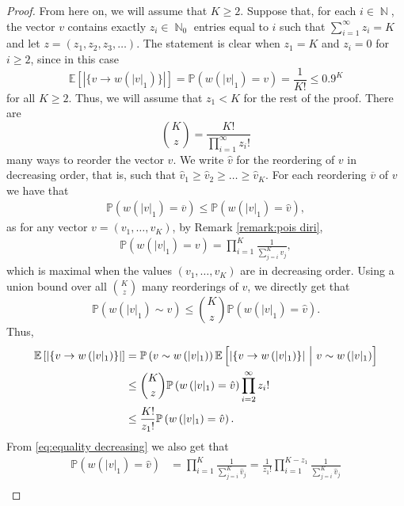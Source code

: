 \documentclass[11pt]{article}
\numberwithin{equation}{section}
\DeclareMathOperator{\N}{\mathbb{N}} %
\newcommand{\p}{\mathbb{P}} %
\newcommand{\E}{\mathbb{E}} %
\newcommand{\be}{\begin{equation}}
\newcommand{\ee}{\end{equation}}
\theoremstyle{definition}
\begin{document}
\begin{proof}
From here on, we will assume that $K \geq 2$.
Suppose that, for each $i\in \N$, the vector $v$ contains exactly $z_i\in\N_0$ entries equal to $i$ such that $\sum_{i=1}^\infty z_i = K$ and let $z = (z_1, z_2, z_3, \dots)$.
The statement is clear when $z_1=K$ and $z_i = 0$ for $i\geq 2$, since in this case
\begin{equation*}
    \E[|\{v\rightarrow w(|v|_1)\}|] = \p \left( w(|v|_1) = v  \right) = \frac{1}{K!} \leq 0.9^K
\end{equation*}
for all $K \geq 2$. Thus, we will assume that $z_1 < K$ for the rest of the proof.
There are 
\be 
\binom{K}{z} = \frac{K!}{\prod_{i=1}^{\infty} z_i!}
\ee 
many ways to reorder the vector $v$. We write $\hat{v}$ for the reordering of $v$ in decreasing order, that is, such that $\hat{v}_1\geq \hat{v}_2\geq \ldots  \geq \hat{v}_K.$ For each reordering $\overline{v}$ of $v$ we have that 
\begin{align*}
	\p\left(w\left(|v|_1\right) = \overline{v} \right)
	\leq
	\p\left(w\left(|v|_1\right) =\hat{v} \right),
\end{align*}
as for any vector $v=(v_1,\ldots,v_K)$, by Remark \ref{remark:pois diri},
\begin{align}\label{eq:equality decreasing}
    \p\left(w\left(|v|_1\right) = v \right) = \prod_{i=1}^{K} \frac{1}{\sum_{j=i}^{K} v_j},
\end{align}
which is maximal when the values $(v_1,\ldots, v_K)$ are in decreasing order. Using a union bound over all $\binom{K}{z}$ many reorderings of $v$, we directly get that 
\be 
\p\left(w\left(|v|_1\right) \sim v \right) \leq \binom{K}{z} \p\left(w\left(|v|_1\right) = \hat{v} \right).
\ee
Thus,
\begin{align}\label{eq:isomorphis expect}
	 \notag \E \left[| \{ v \rightarrow w \left(|v|_1\right) \}|\right]  &= \p \left( v \sim w \left(|v|_1\right) \right)
	 \E \left[| \{ v \rightarrow w \left(|v|_1\right) \}| \ \Big| \ v \sim w \left(|v|_1\right) \right]\\
	 & \notag
	 \leq
	\binom{K}{z}
	\p\left(w\left(|v|_1\right) =  \hat{v}  \right)
	\prod_{i=2}^{\infty} z_i!\\
	&
	\leq 
	\frac{K!}{z_1! } \p\left(w\left(|v|_1\right) =  \hat{v}  \right).
\end{align}
From \eqref{eq:equality decreasing} we also get that
\begin{align*}
    \p\left(w\left(|v|_1\right) =  \hat{v}  \right) 
    &= 
    \prod_{i=1}^{K} \frac{1}{\sum_{j=i}^{K}  \hat{v}_j} 
    = 
    \frac{1}{z_1!} \prod_{i=1}^{K-z_1} \frac{1}{\sum_{j=i}^{K}  \hat{v}_j}\\

\end{align*}
\end{proof}
\end{document}
